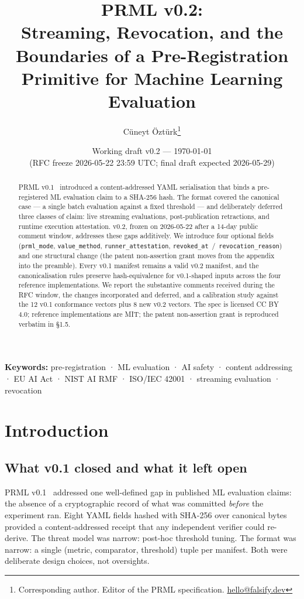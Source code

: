 \documentclass[11pt, a4paper]{article}
\title{\bfseries PRML v0.2:\\[2pt]
{\large Streaming, Revocation, and the Boundaries of a Pre-Registration Primitive for Machine Learning Evaluation}}
\author[1]{Cüneyt Öztürk\thanks{Corresponding author. Editor of the PRML specification. \href{mailto:hello@falsify.dev}{hello@falsify.dev}}}
\affil[1]{Independent}
\date{Working draft v0.2 — \today\\
{\small (RFC freeze 2026-05-22 23:59 UTC; final draft expected 2026-05-29)}}
\begin{document}
\maketitle

\begin{abstract}
\noindent
PRML v0.1~\cite{prml-v01-2026} introduced a content-addressed YAML serialisation that binds a pre-registered ML evaluation claim to a SHA-256 hash. The format covered the canonical case --- a single batch evaluation against a fixed threshold --- and deliberately deferred three classes of claim: live streaming evaluations, post-publication retractions, and runtime execution attestation. v0.2, frozen on 2026-05-22 after a 14-day public comment window, addresses these gaps additively. We introduce four optional fields (\texttt{prml\_mode}, \texttt{value\_method}, \texttt{runner\_attestation}, \texttt{revoked\_at}~/~\texttt{revocation\_reason}) and one structural change (the patent non-assertion grant moves from the appendix into the preamble). Every v0.1 manifest remains a valid v0.2 manifest, and the canonicalisation rules preserve hash-equivalence for v0.1-shaped inputs across the four reference implementations. We report the substantive comments received during the RFC window, the changes incorporated and deferred, and a calibration study against the 12 v0.1 conformance vectors plus 8 new v0.2 vectors. The spec is licensed CC BY 4.0; reference implementations are MIT; the patent non-assertion grant is reproduced verbatim in §1.5.
\end{abstract}

\noindent\textbf{Keywords:} pre-registration · ML evaluation · AI safety · content addressing · EU AI Act · NIST AI RMF · ISO/IEC 42001 · streaming evaluation · revocation

\vspace{1em}

\section{Introduction}
\label{sec:intro}

\subsection{What v0.1 closed and what it left open}

PRML v0.1~\cite{prml-v01-2026} addressed one well-defined gap in published ML evaluation claims: the absence of a cryptographic record of what was committed \emph{before} the experiment ran. Eight YAML fields hashed with SHA-256 over canonical bytes provided a content-addressed receipt that any independent verifier could re-derive. The threat model was narrow: post-hoc threshold tuning. The format was narrow: a single (metric, comparator, threshold) tuple per manifest. Both were deliberate design choices, not oversights.
\end{document}
